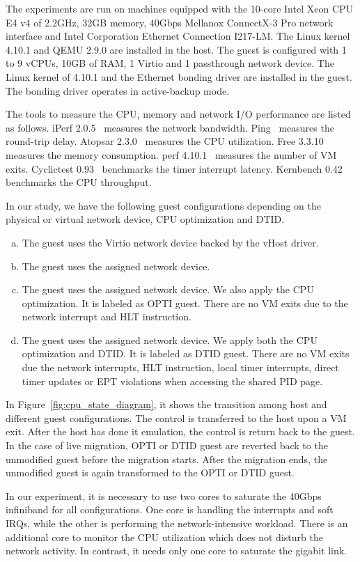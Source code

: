 
The experiments are run on machines equipped with the 10-core
Intel Xeon CPU E4 v4 of 2.2GHz, 32GB memory, 40Gbps Mellanox
ConnectX-3 Pro network interface and Intel Corporation
Ethernet Connection I217-LM. The Linux kernel 4.10.1 and QEMU
2.9.0 are installed in the host. The guest is configured with
1 to 9 vCPUs, 10GB of RAM, 1 Virtio and 1 passthrough network
device. The Linux kernel of 4.10.1 and the Ethernet bonding
driver are installed in the guest. The bonding driver operates
in active-backup mode.

The tools to measure the CPU, memory and network I/O
performance are listed as follows. iPerf 2.0.5~\cite{iperf}
measures the network bandwidth. Ping~\cite{ping} measures the
round-trip delay. Atopsar 2.3.0~\cite{atopsar} measures the
CPU utilization. Free 3.3.10~\cite{free} measures the memory
consumption. perf 4.10.1~\cite{perf} measures the number of VM
exits. Cyclictest 0.93~\cite{cyclictest} benchmarks the timer
interrupt latency. Kernbench 0.42~\cite{kernbench} benchmarks
the CPU throughput.

In our study, we have the following guest configurations
depending on the physical or virtual network device, CPU
optimization and DTID.
\begin{enumerate}[(a)]
  \item The guest uses the Virtio network device backed by the
  vHost driver.
  \item The guest uses the assigned network device.
  \item The guest uses the assigned network device. We also
  apply the CPU optimization. It is labeled as OPTI guest.
  There are no VM exits due to the network interrupt and HLT
  instruction.
  \item The guest uses the assigned network device. We apply
  both the CPU optimization and DTID. It is labeled as DTID
  guest. There are no VM exits due the network interrupts, HLT
  instruction, local timer interrupts, direct timer updates or
  EPT violations when accessing the shared PID page.
  \end{enumerate}
In Figure~\ref{fig:cpu_state_diagram}, it shows the transition
among host and different guest configurations. The control is
transferred to the host upon a VM exit. After the host has
done it emulation, the control is return back to the guest. In
the case of live migration, OPTI or DTID guest are reverted
back to the unmodified guest before the migration starts.
After the migration ends, the unmodified guest is again
transformed to the OPTI or DTID guest.

In our experiment, it is necessary to use two cores to
saturate the 40Gbps infiniband for all configurations. One
core is handling the interrupts and soft IRQs, while the other
is performing the network-intensive workload. There is an
additional core to monitor the CPU utilization which does not
disturb the network activity. In contrast, it needs only one
core to saturate the gigabit link.
